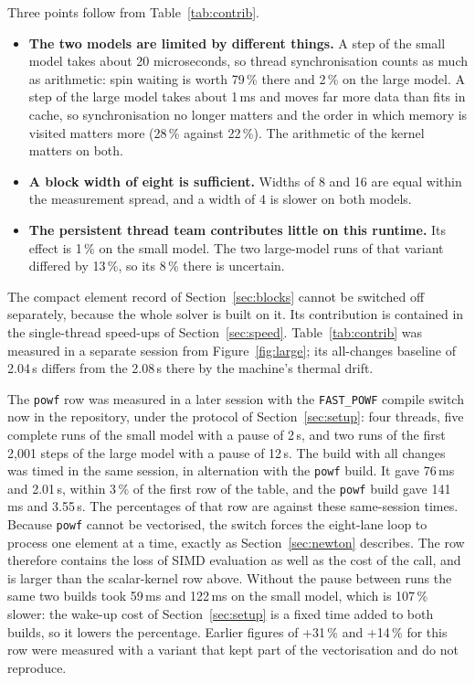 \documentclass[11pt,a4paper]{article}
\newcommand{\code}[1]{\texttt{#1}}
\begin{document}
Three points follow from Table~\ref{tab:contrib}.
\begin{itemize}
\item \textbf{The two models are limited by different things.} A step of the small model takes about 20 microseconds, so thread synchronisation counts as much as arithmetic: spin waiting is worth 79\,\% there and 2\,\% on the large model. A step of the large model takes about 1\,ms and moves far more data than fits in cache, so synchronisation no longer matters and the order in which memory is visited matters more (28\,\% against 22\,\%). The arithmetic of the kernel matters on both.
\item \textbf{A block width of eight is sufficient.} Widths of 8 and 16 are equal within the measurement spread, and a width of 4 is slower on both models.
\item \textbf{The persistent thread team contributes little on this runtime.} Its effect is 1\,\% on the small model. The two large-model runs of that variant differed by 13\,\%, so its 8\,\% there is uncertain.
\end{itemize}
The compact element record of Section~\ref{sec:blocks} cannot be switched off separately, because the whole solver is built on it. Its contribution is contained in the single-thread speed-ups of Section~\ref{sec:speed}. Table~\ref{tab:contrib} was measured in a separate session from Figure~\ref{fig:large}; its all-changes baseline of 2.04\,s differs from the 2.08\,s there by the machine's thermal drift.

The \code{powf} row was measured in a later session with the \code{FAST\_POWF} compile switch now in the repository, under the protocol of Section~\ref{sec:setup}: four threads, five complete runs of the small model with a pause of 2\,s, and two runs of the first 2,001 steps of the large model with a pause of 12\,s. The build with all changes was timed in the same session, in alternation with the \code{powf} build. It gave 76\,ms and 2.01\,s, within 3\,\% of the first row of the table, and the \code{powf} build gave 141\,ms and 3.55\,s. The percentages of that row are against these same-session times. Because \code{powf} cannot be vectorised, the switch forces the eight-lane loop to process one element at a time, exactly as Section~\ref{sec:newton} describes. The row therefore contains the loss of SIMD evaluation as well as the cost of the call, and is larger than the scalar-kernel row above. Without the pause between runs the same two builds took 59\,ms and 122\,ms on the small model, which is 107\,\% slower: the wake-up cost of Section~\ref{sec:setup} is a fixed time added to both builds, so it lowers the percentage. Earlier figures of +31\,\% and +14\,\% for this row were measured with a variant that kept part of the vectorisation and do not reproduce.
\end{document}
